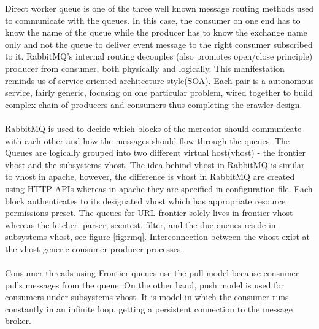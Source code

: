 \noindent
Direct worker queue\cite{asyncmsg} is one of the three well known message routing methods used to communicate with the
queues. In this case, the consumer on one end has to know the name of the queue while the producer has to know the exchange name only and not the queue to deliver event message to the right consumer subscribed to it.
RabbitMQ's internal routing decouples (also promotes open/close principle) producer from consumer, both physically and logically. This manifestation reminds us of service-oriented architecture style(SOA). Each
pair is a autonomous service, fairly generic, focusing on one particular problem, wired together to build complex chain of producers and consumers thus completing the crawler design.
\\
\\
\noindent
RabbitMQ is used to decide which blocks of the mercator should communicate with each other and how the
messages should flow through the queues. The Queues are logically grouped into two different virtual
host(vhost) - the frontier vhost and the subsystems vhost. The idea behind vhost in RabbitMQ is similar
to vhost in apache, however, the difference is vhost in RabbitMQ are created using HTTP APIs whereas
in apache they are specified in configuration file. Each block authenticates to its designated vhost which has
appropriate resource permissions preset. The queues for URL frontier solely lives in frontier vhost
whereas the fetcher, parser, seentest, filter, and the due queues reside in subsystems vhost, see figure
\ref{fig:rmq}. Interconnection between the vhost exist at the vhost generic consumer-producer processes.
\\
\\
\noindent
Consumer threads using Frontier queues use the pull model because consumer pulls messages from the queue.
On the other hand, push model is used for consumers under subsystems vhost. It is model in which the
consumer runs constantly in an infinite loop, getting a persistent connection to the message broker.

\pagebreak

